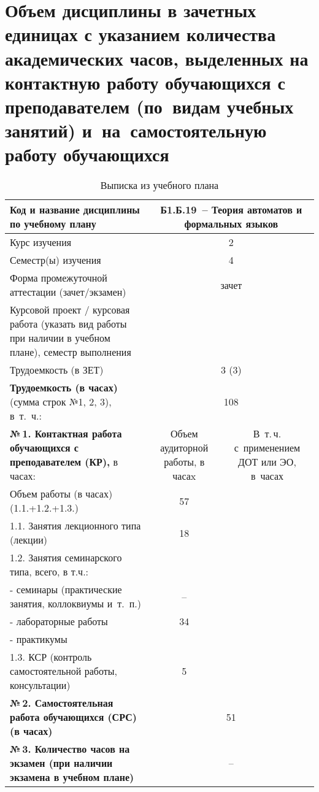\documentclass[a4paper,12pt]{article}
\begin{document}
\newpage

\section{Объем дисциплины в зачетных единицах с указанием количества академических часов, выделенных на контактную работу обучающихся с преподавателем (по~видам учебных занятий) и~на~самостоятельную работу обучающихся}

\begin{table}[H]
\caption{Выписка из учебного плана} 
\begin{tabular}{|p{9cm}|c|c|}
\hline
Код и название дисциплины по учебному плану & \multicolumn{2}{p{6cm}|}{Б1.Б.19\ -- Теория автоматов и формальных языков }\\
\hline
Курс изучения &\multicolumn{2}{c|}{ 2 }\\
\hline
Семестр(ы) изучения &\multicolumn{2}{c|}{ 4 }\\
\hline
Форма промежуточной аттестации (зачет/экзамен) &\multicolumn{2}{c|}{ зачет }\\
\hline
Курсовой проект / курсовая работа (указать вид работы при наличии в учебном плане), семестр выполнения &\multicolumn{2}{c|}{ }\\
\hline
Трудоемкость (в ЗЕТ) &\multicolumn{2}{c|}{ 3 (3) }\\
\hline
{\bf Трудоемкость (в часах)} (сумма строк №1, 2, 3), в~т.~ч.:& \multicolumn{2}{c|}{108}\\
\hline
\textbf{№\,1. Контактная работа обучающихся с преподавателем (КР),} в часах:
& \multicolumn{1}{p{3cm}|}{\centering Объем аудиторной работы, в часаx}
& \multicolumn{1}{p{3cm}|}{\centering\arraybackslash В~т.\,ч. с~применением ДОТ или ЭО, в~часах}\\
\hline  
Объем работы (в часах) (1.1.+1.2.+1.3.)& 57 & \\
\hline
1.1. Занятия лекционного типа (лекции) & 18 & \\
\hline
1.2. Занятия семинарского типа, всего, в т.ч.: & & \\
\hline
- семинары (практические занятия, коллоквиумы и~т.~п.)  & – & \\
\hline
- лабораторные работы& 34 & \\
\hline
- практикумы & & \\
\hline
1.3. КСР (контроль самостоятельной работы, консультации)& 5 & \\
\hline
{\bf №\,2. Самостоятельная работа обучающихся (СРС) (в часах)}& \multicolumn{2}{c|}{51}\\
\hline
{\bf №\,3. Количество часов на экзамен (при наличии экзамена в учебном плане)}& \multicolumn{2}{c|}{–}\\
\hline
\end{tabular}
\end{table}
\end{document}
